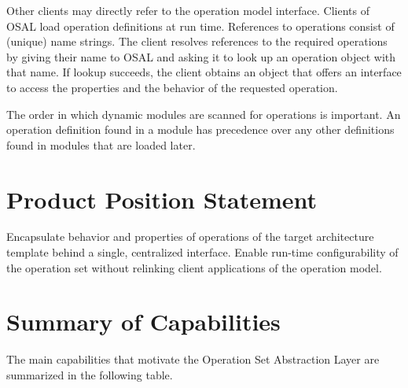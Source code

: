 \documentclass[twoside]{tce}
\begin{document}
Other clients may directly refer to the operation model interface.  Clients
of OSAL load operation definitions at run time.  References to operations
consist of (unique) name strings.  The client resolves references to the
required operations by giving their name to OSAL and asking it to look up an
operation object with that name.  If lookup succeeds, the client obtains an
object that offers an interface to access the properties and the behavior
of the requested operation.

The order in which dynamic modules are scanned for operations is important.
An operation definition found in a module has precedence over any other
definitions found in modules that are loaded later.

\section{Product Position Statement}

Encapsulate behavior and properties of operations of the target architecture
template behind a single, centralized interface. Enable run-time
configurability of the operation set without relinking client applications
of the operation model.

\section{Summary of Capabilities}

The main capabilities that motivate the Operation Set Abstraction Layer are
summarized in the following table.
\end{document}
